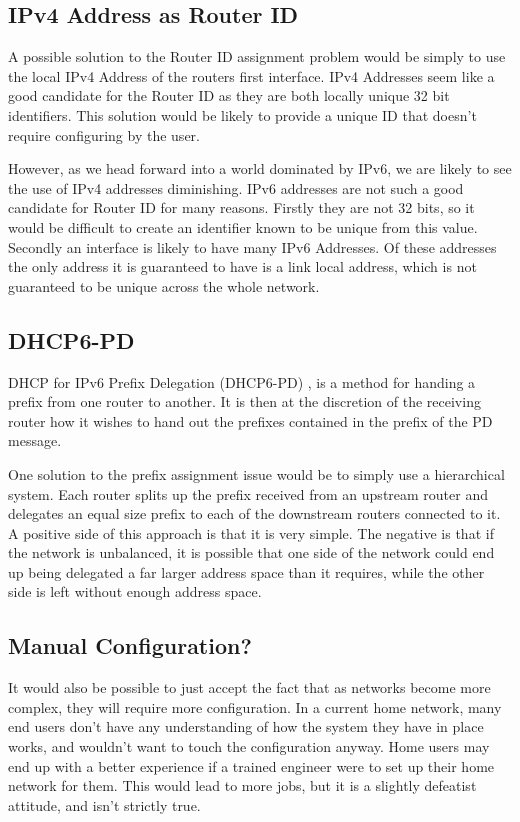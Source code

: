 \documentclass[12pt]{report}
\begin{document}
\subsection{IPv4 Address as Router ID}
A possible solution to the Router ID assignment problem would be simply to use
the local IPv4 Address of the routers first interface. IPv4 Addresses seem like
a good candidate for the Router ID as they are both locally unique 32 bit
identifiers. This solution would be likely to provide a unique ID that doesn't
require configuring by the user.
 
However, as we head forward into a world dominated by IPv6, we are likely to
see the use of IPv4 addresses diminishing. IPv6 addresses are not such a good
candidate for Router ID for many reasons. Firstly they are not 32 bits, so it
would be difficult to create an identifier known to be unique from this value.
Secondly an interface is likely to have many IPv6 Addresses. Of these addresses
the only address it is guaranteed to have is a link local address, which is not
guaranteed to be unique across the whole network. 

\subsection{DHCP6-PD}
DHCP for IPv6 Prefix Delegation (DHCP6-PD) , is a method for handing a prefix from one router to
another. It is then at the discretion of the receiving router how it wishes to
hand out the prefixes contained in the prefix of the PD message. 

One solution to the prefix assignment issue would be to simply use a
hierarchical system. Each router splits up the prefix received from an upstream
router and delegates an equal size prefix to each of the downstream routers
connected to it. A positive side of this approach is that it is very simple.
The negative is that if the network is unbalanced, it is possible that one side
of the network could end up being delegated a far larger address space than it
requires, while the other side is left without enough address space.  

\subsection{Manual Configuration?}
It would also be possible to just accept the fact that as networks become more
complex, they will require more configuration. In a current home network, many
end users don't have any understanding of how the system they have in place
works, and wouldn't want to touch the configuration anyway. Home users may end
up with a better experience if a trained engineer were to set up their home
network for them. This would lead to more jobs, but it is a slightly defeatist
attitude, and isn't strictly true. 
\end{document}
